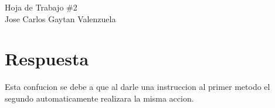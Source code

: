 \documentclass[10pt,a4paper]{article}
\begin{document}
\begin{center}
       \huge {Hoja de Trabajo \#2}\\
        \large{Jose Carlos Gaytan Valenzuela} \
\end{center}
\section{Respuesta}
Esta confucion se debe a que al darle una instruccion al primer metodo el segundo automaticamente realizara la misma accion. 
\end{document}
